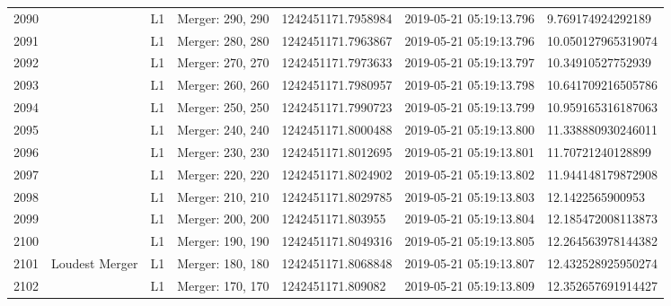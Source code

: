 \begin{longtable}{lllllll}
2090 &                                                    &       L1 &  Merger: 290, 290 &  1242451171.7958984 &  2019-05-21 05:19:13.796 &   9.769174924292189 \\
2091 &                                                    &       L1 &  Merger: 280, 280 &  1242451171.7963867 &  2019-05-21 05:19:13.796 &  10.050127965319074 \\
2092 &                                                    &       L1 &  Merger: 270, 270 &  1242451171.7973633 &  2019-05-21 05:19:13.797 &   10.34910527752939 \\
2093 &                                                    &       L1 &  Merger: 260, 260 &  1242451171.7980957 &  2019-05-21 05:19:13.798 &  10.641709216505786 \\
2094 &                                                    &       L1 &  Merger: 250, 250 &  1242451171.7990723 &  2019-05-21 05:19:13.799 &  10.959165316187063 \\
2095 &                                                    &       L1 &  Merger: 240, 240 &  1242451171.8000488 &  2019-05-21 05:19:13.800 &  11.338880930246011 \\
2096 &                                                    &       L1 &  Merger: 230, 230 &  1242451171.8012695 &  2019-05-21 05:19:13.801 &   11.70721240128899 \\
2097 &                                                    &       L1 &  Merger: 220, 220 &  1242451171.8024902 &  2019-05-21 05:19:13.802 &  11.944148179872908 \\
2098 &                                                    &       L1 &  Merger: 210, 210 &  1242451171.8029785 &  2019-05-21 05:19:13.803 &    12.1422565900953 \\
2099 &                                                    &       L1 &  Merger: 200, 200 &   1242451171.803955 &  2019-05-21 05:19:13.804 &  12.185472008113873 \\
2100 &                                                    &       L1 &  Merger: 190, 190 &  1242451171.8049316 &  2019-05-21 05:19:13.805 &  12.264563978144382 \\
2101 &                                     Loudest Merger &       L1 &  Merger: 180, 180 &  1242451171.8068848 &  2019-05-21 05:19:13.807 &  12.432528925950274 \\
2102 &                                                    &       L1 &  Merger: 170, 170 &   1242451171.809082 &  2019-05-21 05:19:13.809 &  12.352657691914427 \\

\end{longtable}
